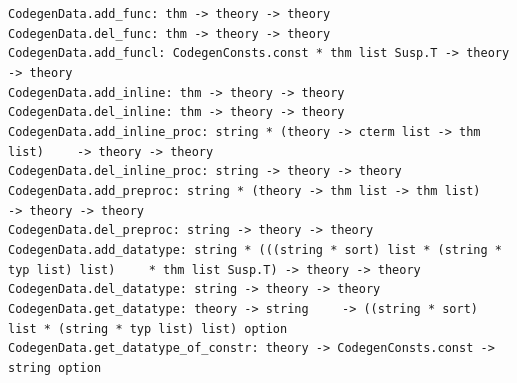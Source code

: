 \begin{isabellebody}
\begin{isamarkuptext}
\begin{description}
  \end{description}%
\end{isamarkuptext}%
\isamarkuptrue%
%
\endisatagmlref
{\isafoldmlref}%
%
\isadelimmlref
%
\endisadelimmlref
%
\isamarkuptrue%
%
\isadelimmlref
%
\endisadelimmlref
%
\isatagmlref
%
\begin{isamarkuptext}%
\begin{mldecls}
  \verb|CodegenData.add_func: thm -> theory -> theory| \\
  \verb|CodegenData.del_func: thm -> theory -> theory| \\
  \verb|CodegenData.add_funcl: CodegenConsts.const * thm list Susp.T -> theory -> theory| \\
  \verb|CodegenData.add_inline: thm -> theory -> theory| \\
  \verb|CodegenData.del_inline: thm -> theory -> theory| \\
  \verb|CodegenData.add_inline_proc: string * (theory -> cterm list -> thm list)|\isasep\isanewline%
\verb|    -> theory -> theory| \\
  \verb|CodegenData.del_inline_proc: string -> theory -> theory| \\
  \verb|CodegenData.add_preproc: string * (theory -> thm list -> thm list)|\isasep\isanewline%
\verb|    -> theory -> theory| \\
  \verb|CodegenData.del_preproc: string -> theory -> theory| \\
  \verb|CodegenData.add_datatype: string * (((string * sort) list * (string * typ list) list)|\isasep\isanewline%
\verb|    * thm list Susp.T) -> theory -> theory| \\
  \verb|CodegenData.del_datatype: string -> theory -> theory| \\
  \verb|CodegenData.get_datatype: theory -> string|\isasep\isanewline%
\verb|    -> ((string * sort) list * (string * typ list) list) option| \\
  \verb|CodegenData.get_datatype_of_constr: theory -> CodegenConsts.const -> string option|
  \end{mldecls}


\end{isamarkuptext}
\end{isabellebody}
